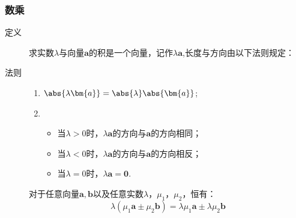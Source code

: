     \subsubsection{数乘}
      \begin{description}
        \item[定义] 求实数$ \lambda $与向量$\bm{a}$的积是一个向量，记作$\lambda\bm{a}$,长度与方向由以下法则规定：
        \item[法则]
          \begin{enumerate}[label=\arabic*)]
            \item $\abs{\lambda \bm{a}}=\abs{\lambda}\abs{\bm{a}} $;
            \item
              \begin{itemize}
                \item 当$ \lambda>0 $时，$ \lambda\bm{a} $的方向与$\bm{a}$的方向相同；
                \item 当$ \lambda<0 $时，$ \lambda\bm{a} $的方向与$\bm{a}$的方向相反；
                \item 当$ \lambda=0 $时，$ \lambda\bm{a}=\bm 0 $.
              \end{itemize}
          \end{enumerate}
        对于任意向量$\bm a,\bm b$以及任意实数$\lambda$，$\mu_1$，$\mu_2$，恒有：
        \[\lambda({\mu_1\bm a}\pm{\mu_2\bm b})={\lambda\mu_1\bm a}\pm{\lambda\mu_2\bm b}\]
      \end{description}
